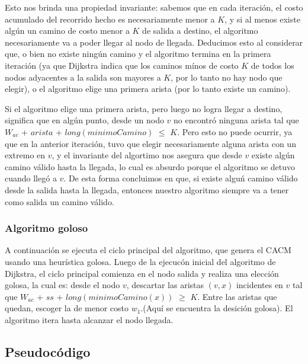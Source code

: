 Esto nos brinda una propiedad invariante: sabemos que en cada iteraci\'on, el costo acumulado del recorrido hecho es necesariamente menor a $K$, y si al menos existe alg\'un un camino de costo menor a $K$ de salida a destino, el algoritmo necesariamente va a poder llegar al nodo de llegada. Deducimos esto al considerar que, o bien no existe ning\'un camino y  el algoritmo termina en la primera iteraci\'on (ya que Dijkstra indica que los caminos m\'inos de costo $K$ de todos los nodos adyacentes a la salida son mayores a $K$, por lo tanto no hay nodo que elegir), o el algoritmo elige una primera arista (por lo tanto existe un camino). 

\vspace{2mm}

Si el algoritmo elige una primera arista, pero luego no logra llegar a destino, significa que en alg\'un punto, desde un nodo $v$ no encontr\'o ninguna arista tal que $W_{ac}$ + $arista$ + $long(minimoCamino)$ $\leq$ $K$. Pero esto no puede ocurrir, ya que en la anterior iteraci\'on, tuvo que elegir necesariamente alguna arista con un extremo en $v$, y el invariante del algortimo nos asegura que desde $v$ existe alg\'un camino v\'alido hasta la llegada, lo cual es absurdo porque el algoritmo se detuvo cuando lleg\'o a $v$. De esta forma concluimos en que, si existe algu\'n camino v\'alido desde la salida hasta la llegada, entonces nuestro algoritmo siempre va a tener como salida un camino v\'alido.

\subsubsection{Algoritmo goloso}

A continuaci\'on se ejecuta el ciclo principal del algoritmo, que genera el CACM usando una heur\'istica golosa. Luego de la ejecuc\'on inicial del algoritmo de Dijkstra, el ciclo principal comienza en el nodo salida y realiza una elecci\'on golosa, la cual es: desde el nodo $v$, descartar las aristas $(v,x)$ incidentes en $v$ tal que $W_{ac}$ + $ss$ + $long(minimoCamino(x))$ $\geq$ $K$. Entre las aristas que quedan, escoger la de menor costo $w_1$.(Aqu\'i se encuentra la desici\'on golosa). El algoritmo itera hasta alcanzar el nodo llegada.

\subsection{Pseudoc\'odigo}


